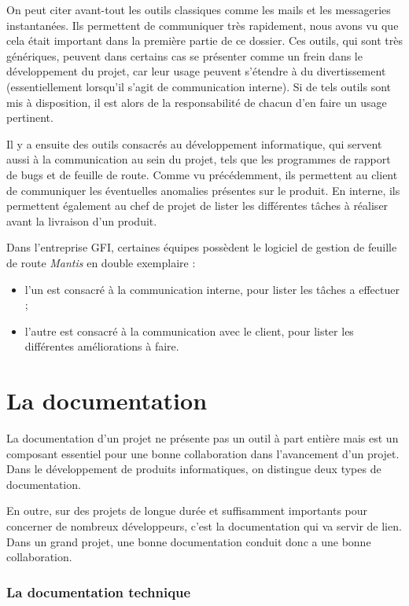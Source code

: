 On peut citer avant-tout les outils classiques comme les mails et les messageries instantanées. Ils permettent de communiquer très rapidement, nous avons vu que cela était important dans la première partie de ce dossier. Ces outils, qui sont très génériques, peuvent dans certains cas se présenter comme un frein dans le développement du projet, car leur usage peuvent s'étendre à du divertissement (essentiellement lorsqu'il s'agit de communication interne). Si de tels outils sont mis à disposition, il est alors de la responsabilité de chacun d'en faire un usage pertinent.

Il y a ensuite des outils consacrés au développement informatique, qui servent aussi à la communication au sein du projet, tels que les programmes de rapport de bugs et de feuille de route. Comme vu précédemment, ils permettent au client de communiquer les éventuelles anomalies présentes sur le produit. En interne, ils permettent également au chef de projet de lister les différentes tâches à réaliser avant la livraison d'un produit.

\begin{app}
Dans l'entreprise GFI, certaines équipes possèdent le logiciel de gestion de feuille de route \textit{Mantis} en double exemplaire :
\begin{itemize}
\item l'un est consacré à la communication interne, pour lister les tâches a effectuer ;
\item l'autre est consacré à la communication avec le client, pour lister les différentes améliorations à faire.
\end{itemize}
\end{app}

\section{La documentation}

La documentation d'un projet ne présente pas un outil à part entière mais est un composant essentiel pour une bonne collaboration dans l'avancement d'un projet. Dans le développement de produits informatiques, on distingue deux types de documentation.

En outre, sur des projets de longue durée et suffisamment importants pour concerner de nombreux développeurs, c'est la documentation qui va servir de lien. Dans un grand projet, une bonne documentation conduit donc a une bonne collaboration.

\subsubsection{La documentation technique}

